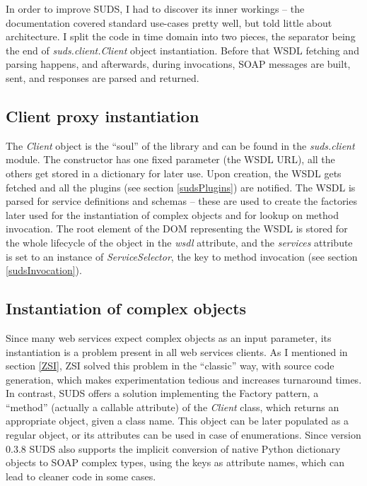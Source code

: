 In order to improve SUDS, I had to discover its inner workings -- the documentation covered standard use-cases pretty well, but told little about architecture. I split the code in time domain into two pieces, the separator being the end of \emph{suds.client.Client} object instantiation. Before that WSDL fetching and parsing happens, and afterwards, during invocations, SOAP messages are built, sent, and responses are parsed and returned.

\subsection{Client proxy instantiation}

The \emph{Client} object is the ``soul'' of the library and can be found in the \emph{suds.client} module. The constructor has one fixed parameter (the WSDL URL), all the others get stored in a dictionary for later use. Upon creation, the WSDL gets fetched and all the plugins (see section \ref{sudsPlugins}) are notified. The WSDL is parsed for service definitions and schemas -- these are used to create the factories later used for the instantiation of complex objects and for lookup on method invocation. The root element of the DOM representing the WSDL is stored for the whole lifecycle of the object in the \emph{wsdl} attribute, and the \emph{services} attribute is set to an instance of \emph{ServiceSelector}, the key to method invocation (see section \ref{sudsInvocation}).

\subsection{Instantiation of complex objects}

Since many web services expect complex objects as an input parameter, its instantiation is a problem present in all web services clients. As I mentioned in section \ref{ZSI}, ZSI solved this problem in the ``classic'' way, with source code generation, which makes experimentation tedious and increases turnaround times. In contrast, SUDS offers a solution implementing the Factory pattern, a ``method'' (actually a callable attribute) of the \emph{Client} class, which returns an appropriate object, given a class name. This object can be later populated as a regular object, or its attributes can be used in case of enumerations. Since version 0.3.8 SUDS also supports the implicit conversion of native Python dictionary objects to SOAP complex types, using the keys as attribute names, which can lead to cleaner code in some cases.

